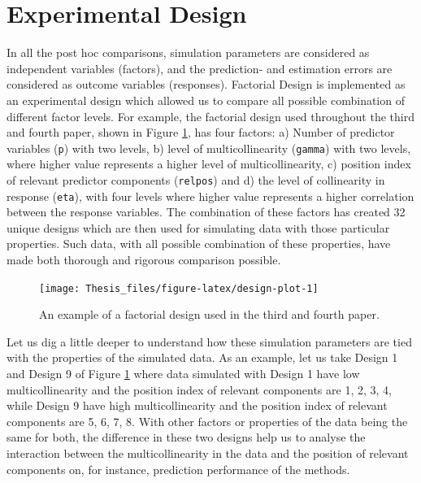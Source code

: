 \documentclass[11pt,twoside,openright,titlepage,
  headinclude,footinclude,BCOR=5mm,
  numbers=noenddot,cleardoublepage=empty,
  tablecaptionabove, dottedtoc,
  bibliography=totoc,paper=a4]{scrreprt}
\begin{document}
\hypertarget{experimental-design}{%
\section{Experimental Design}\label{experimental-design}}

In all the post hoc comparisons, simulation parameters are considered as independent variables (factors), and the prediction- and estimation errors are considered as outcome variables (responses). Factorial Design is implemented as an experimental design which allowed us to compare all possible combination of different factor levels. For example, the factorial design used throughout the third and fourth paper, shown in Figure \ref{fig:design-plot}, has four factors: a) Number of predictor variables (\texttt{p}) with two levels, b) level of multicollinearity (\texttt{gamma}) with two levels, where higher value represents a higher level of multicollinearity, c) position index of relevant predictor components (\texttt{relpos}) and d) the level of collinearity in response (\texttt{eta}), with four levels where higher value represents a higher correlation between the response variables. The combination of these factors has created 32 unique designs which are then used for simulating data with those particular properties. Such data, with all possible combination of these properties, have made both thorough and rigorous comparison possible.



\begin{figure}[!htb]
\texttt{[image: Thesis\_files/figure-latex/design-plot-1]} \caption{An example of a factorial design used in the third and fourth paper.}\label{fig:design-plot}
\end{figure}

Let us dig a little deeper to understand how these simulation parameters are tied with the properties of the simulated data. As an example, let us take Design 1 and Design 9 of Figure \ref{fig:design-plot} where data simulated with Design 1 have low multicollinearity and the position index of relevant components are 1, 2, 3, 4, while Design 9 have high multicollinearity and the position index of relevant components are 5, 6, 7, 8. With other factors or properties of the data being the same for both, the difference in these two designs help us to analyse the interaction between the multicollinearity in the data and the position of relevant components on, for instance, prediction performance of the methods.
\end{document}
